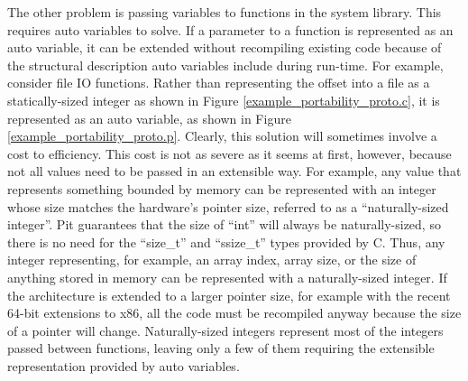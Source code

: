 The other problem is passing variables to functions in the system library.  This requires auto variables to solve.  If
a parameter to a function is represented as an auto variable, it can be extended without recompiling existing code
because of the structural description auto variables include during run-time.  For example, consider file IO functions.
Rather than representing the offset into a file as a statically-sized integer as shown in Figure
\ref{example_portability_proto.c}, it is represented as an auto variable, as
shown in Figure \ref{example_portability_proto.p}.  Clearly, this solution will sometimes involve a cost to
efficiency.  This cost is not as severe as it seems at first, however, because not all values need to be passed in an
extensible way.  For example, any value that represents something bounded by memory can be represented with an integer
whose size matches the hardware's pointer size, referred to as a ``naturally-sized integer''.  Pit guarantees
that the size of ``int'' will always be naturally-sized, so there is no need for the ``size\_t'' and ``ssize\_t''
types provided by C.  Thus, any integer representing, for example, an array index, array size, or the size of anything
stored in memory can be represented with
a naturally-sized integer.  If the architecture is extended to a larger pointer size, for example with the recent
64-bit extensions to x86, all the code must be recompiled anyway because the size of a pointer will change.
Naturally-sized integers represent most of the integers passed between functions, leaving only a few of them
requiring the extensible representation provided by auto variables.

